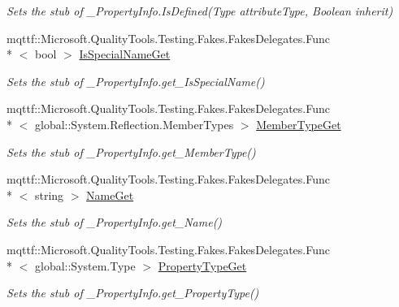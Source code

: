 \begin{DoxyCompactItemize}
\begin{DoxyCompactList}\small\item\em Sets the stub of \-\_\-\-Property\-Info.\-Is\-Defined(\-Type attribute\-Type, Boolean inherit)\end{DoxyCompactList}\item 
mqttf\-::\-Microsoft.\-Quality\-Tools.\-Testing.\-Fakes.\-Fakes\-Delegates.\-Func\\*
$<$ bool $>$ \hyperlink{class_system_1_1_runtime_1_1_interop_services_1_1_fakes_1_1_stub___property_info_afc59c4ab00d2aca1b7b4e451128511df}{Is\-Special\-Name\-Get}
\begin{DoxyCompactList}\small\item\em Sets the stub of \-\_\-\-Property\-Info.\-get\-\_\-\-Is\-Special\-Name()\end{DoxyCompactList}\item 
mqttf\-::\-Microsoft.\-Quality\-Tools.\-Testing.\-Fakes.\-Fakes\-Delegates.\-Func\\*
$<$ global\-::\-System.\-Reflection.\-Member\-Types $>$ \hyperlink{class_system_1_1_runtime_1_1_interop_services_1_1_fakes_1_1_stub___property_info_a4faab89c04f7198f8f08ddb1c4288158}{Member\-Type\-Get}
\begin{DoxyCompactList}\small\item\em Sets the stub of \-\_\-\-Property\-Info.\-get\-\_\-\-Member\-Type()\end{DoxyCompactList}\item 
mqttf\-::\-Microsoft.\-Quality\-Tools.\-Testing.\-Fakes.\-Fakes\-Delegates.\-Func\\*
$<$ string $>$ \hyperlink{class_system_1_1_runtime_1_1_interop_services_1_1_fakes_1_1_stub___property_info_a4e913fa0b8c857fc0f325940de02c8a7}{Name\-Get}
\begin{DoxyCompactList}\small\item\em Sets the stub of \-\_\-\-Property\-Info.\-get\-\_\-\-Name()\end{DoxyCompactList}\item 
mqttf\-::\-Microsoft.\-Quality\-Tools.\-Testing.\-Fakes.\-Fakes\-Delegates.\-Func\\*
$<$ global\-::\-System.\-Type $>$ \hyperlink{class_system_1_1_runtime_1_1_interop_services_1_1_fakes_1_1_stub___property_info_a54e408ad7b1b8b13c7aa74d246817c31}{Property\-Type\-Get}
\begin{DoxyCompactList}\small\item\em Sets the stub of \-\_\-\-Property\-Info.\-get\-\_\-\-Property\-Type()\end{DoxyCompactList}\item 

\end{DoxyCompactItemize}
